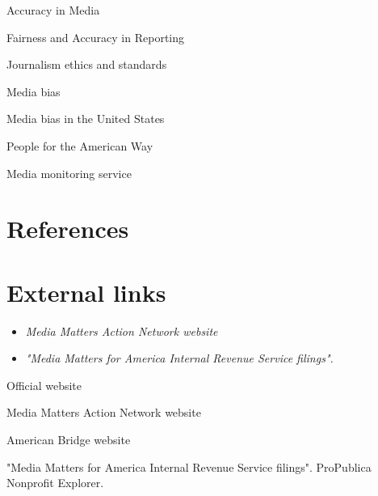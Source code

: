 Accuracy in Media

Fairness and Accuracy in Reporting

Journalism ethics and standards

Media bias

Media bias in the United States

People for the American Way

Media monitoring service

\section{References}\label{references}

\section{External links}\label{external-links}

\begin{itemize}
\item
  \emph{Media Matters Action Network website}
\item
  \emph{"Media Matters for America Internal Revenue Service filings".}
\end{itemize}

Official website

Media Matters Action Network website

American Bridge website

"Media Matters for America Internal Revenue Service filings". ProPublica
Nonprofit Explorer.
